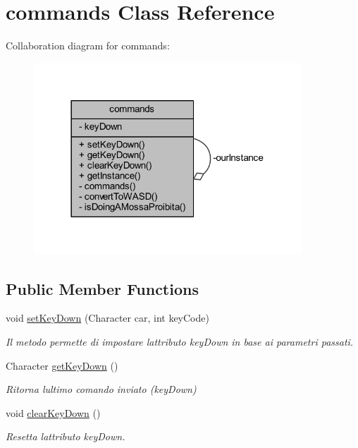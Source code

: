 \hypertarget{class_snake_1_1game_1_1utility_1_1commands}{}\section{commands Class Reference}
\label{class_snake_1_1game_1_1utility_1_1commands}


Collaboration diagram for commands\+:
\nopagebreak
\begin{figure}[H]
\begin{center}
\leavevmode
\includegraphics[width=285pt]{class_snake_1_1game_1_1utility_1_1commands__coll__graph}
\end{center}
\end{figure}
\subsection*{Public Member Functions}
\begin{DoxyCompactItemize}
\item 
void \mbox{\hyperlink{class_snake_1_1game_1_1utility_1_1commands_a116fb077976b2f81b0fc36845423fadb}{set\+Key\+Down}} (Character car, int key\+Code)
\begin{DoxyCompactList}\small\item\em Il metodo permette di impostare l\textquotesingle{}attributo key\+Down in base ai parametri passati. \end{DoxyCompactList}\item 
Character \mbox{\hyperlink{class_snake_1_1game_1_1utility_1_1commands_aca1e2aeb7fb5a02cf6127edc96edc7f6}{get\+Key\+Down}} ()
\begin{DoxyCompactList}\small\item\em Ritorna l\textquotesingle{}ultimo comando inviato (key\+Down) \end{DoxyCompactList}\item 
void \mbox{\hyperlink{class_snake_1_1game_1_1utility_1_1commands_a8b2e8ab4e21c2a33e48e38fb8567fb19}{clear\+Key\+Down}} ()
\begin{DoxyCompactList}\small\item\em Resetta l\textquotesingle{}attributo key\+Down. \end{DoxyCompactList}\end{DoxyCompactItemize}
